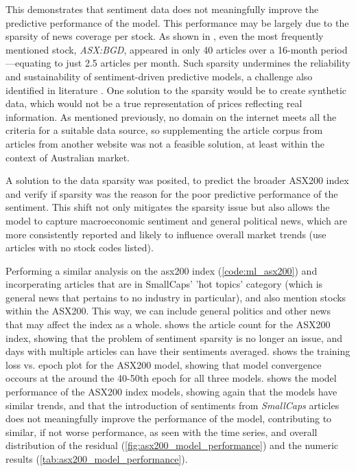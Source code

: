 This demonstrates that sentiment data does not meaningfully improve the predictive performance of the model. This performance may be largely due to the sparsity of news coverage per stock. As shown in , even the most frequently mentioned stock, \textit{ASX:BGD}, appeared in only 40 articles over a 16-month period—equating to just 2.5 articles per month. Such sparsity undermines the reliability and sustainability of sentiment-driven predictive models, a challenge also identified in literature \cite{zhang_markov_model}. One solution to the sparsity would be to create synthetic data, which would not be a true representation of prices reflecting real information. As mentioned previously, no domain on the internet meets all the criteria for a suitable data source, so supplementing the article corpus from articles from another website was not a feasible solution, at least within the context of Australian market.

A solution to the data sparsity was posited, to predict the broader ASX200 index and verify if sparsity was the reason for the poor predictive performance of the sentiment. This shift not only mitigates the sparsity issue but also allows the model to capture macroeconomic sentiment and general political news, which are more consistently reported and likely to influence overall market trends (use articles with no stock codes listed).

Performing a similar analysis on the asx200 index (\cref{code:ml_asx200}) and incorperating articles that are in SmallCaps' 'hot topics' category (which is general news that pertains to no industry in particular), and also mention stocks within the ASX200. This way, we can include general politics and other news that may affect the index as a whole.  shows the article count for the ASX200 index, showing that the problem of sentiment sparsity is no longer an issue, and days with multiple articles can have their sentiments averaged.  shows the training loss vs. epoch plot for the ASX200 model, showing that model convergence occours at the around the 40-50th epoch for all three models.  shows the model performance of the ASX200 index models, showing again that the models have similar trends, and that the introduction of sentiments from \textit{SmallCaps} articles does not meaningfully improve the performance of the model, contributing to similar, if not worse performance, as seen with the time series, and overall distribution of the residual (\cref{fig:asx200_model_performance}) and the numeric results (\cref{tab:asx200_model_performance}). 


